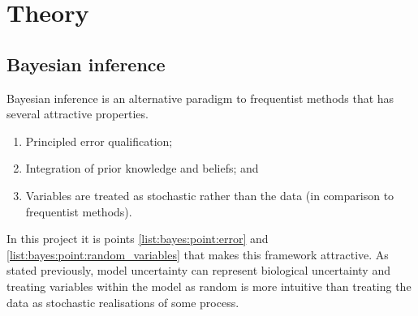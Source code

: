 \documentclass[12pt]{article} %
\begin{document}
	

	
	
	
%	

	\section{Theory}	
	\subsection{Bayesian inference}	
	Bayesian inference is an alternative paradigm to frequentist methods that has several attractive properties.
	
	\begin{enumerate} \label{list:bayes}
		\item \label{list:bayes:point:error} Principled error qualification;
		\item Integration of prior knowledge and beliefs; and
		\item \label{list:bayes:point:random_variables} Variables are treated as stochastic rather than the data (in comparison to frequentist methods).
	\end{enumerate}
	In this project it is points \ref{list:bayes:point:error} and \ref{list:bayes:point:random_variables} that makes this framework attractive. As stated previously, model uncertainty can represent biological uncertainty and treating variables within the model as random is more intuitive than treating the data as stochastic realisations of some process.
	
\end{document}
